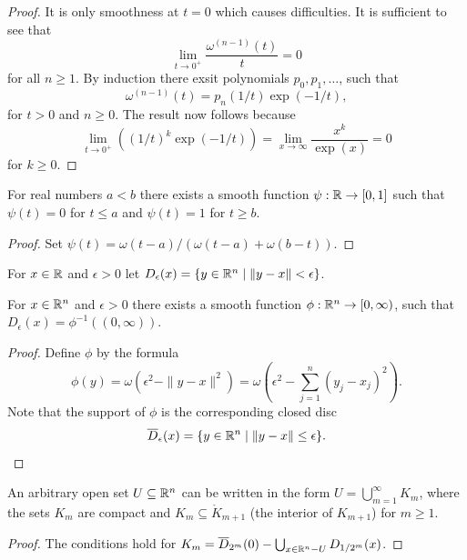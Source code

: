 \begin{proof}
  It is only smoothness at $t = 0$ which causes difficulties. It is sufficient to see that
  \[
    \lim_{t\to 0^+} \frac{\omega^{(n-1)}(t)}{t} = 0
  \]
  for all $n\ge 1$. By induction there exsit polynomials $p_0, p_1, \ldots$, such that 
  \[
    \omega^{(n-1)}(t) = p_n(1/t)\exp(-1/t),
  \]
  for $t>0$ and $n\ge 0$. The result now follows because
  \[
    \lim_{t\to 0^+} \left((1/t)^k\exp(-1/t)\right) 
    = \lim_{x\to\infty} \frac{x^k}{\exp(x)}
    = 0
  \]
  for $k\ge 0$.
\end{proof}

\begin{corollary}\label{corollary:A.3}
  For real numbers $a<b$ there exists a smooth function $\psi:{\mathbb{R}}\to[0, 1]$
  such that $\psi(t)=0$ for $t\le a$ and $\psi(t)=1$ for $t\ge b$.
\end{corollary}

\begin{proof}
  Set $\psi(t) = \omega(t-a)/(\omega(t-a)+\omega(b-t))$.
\end{proof}

For $x\in{\ensuremath{\mathbb{R}}}$ and $\epsilon>0$ let $D_\epsilon(x) = \{y\in{\ensuremath{\mathbb{R}}}^n\mid \|y-x\|<\epsilon\}$.


\begin{corollary}\label{corollary:A.4}
  For $x\in{\ensuremath{\mathbb{R}}}^n$ and $\epsilon>0$ there exists a smooth function $\phi:{\mathbb{R}}^n\to[0, \infty)$, such that 
  $D_\epsilon(x) = \phi^{-1}((0, \infty))$.
\end{corollary}

\begin{proof}
  Define $\phi$ by the formula 
  \[
    \phi(y) = \omega(\epsilon^2-\|y-x\|^2)
    = \omega(\epsilon^2 - \sum_{j=1}^n (y_j-x_j)^2).
  \]
  Note that the support of $\phi$ is the corresponding closed disc 
  \[
    \overline{D}_\epsilon(x) = \{y\in{\ensuremath{\mathbb{R}}}^n\mid \|y-x\|\le\epsilon\}.
  \]
\end{proof}

\begin{lemma}\label{lemma:A.5}
  An arbitrary open set $U\subseteq{\ensuremath{\mathbb{R}}}^n$ can be written in the form $U=\bigcup_{m=1}^\infty K_m$, where the sets $K_m$ 
  are compact and $K_m\subseteq \mathring{K}_{m+1}$ (the interior of $K_{m+1}$) for $m\ge 1$.
\end{lemma}

\begin{proof}
  The conditions hold for $K_m = \overline{D}_{2^m}(0) - \bigcup_{x\in{\ensuremath{\mathbb{R}}}^n-U} D_{1/2^m}(x)$.
\end{proof}


